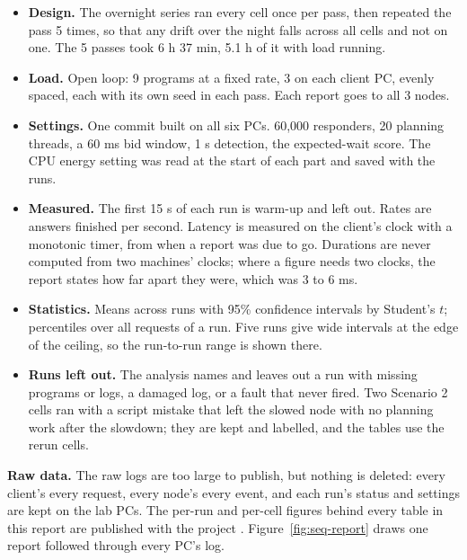 \begin{itemize}
  \item \textbf{Design.} The overnight series ran every cell once per pass, then repeated the pass 5 times, so that any drift over the night falls across all cells and not on one. The 5 passes took 6 h 37 min, 5.1 h of it with load running.
  \item \textbf{Load.} Open loop: 9 programs at a fixed rate, 3 on each client PC, evenly spaced, each with its own seed in each pass. Each report goes to all 3 nodes.
  \item \textbf{Settings.} One commit built on all six PCs. 60,000 responders, 20 planning threads, a 60 ms bid window, 1 s detection, the expected-wait score. The CPU energy setting was read at the start of each part and saved with the runs.
  \item \textbf{Measured.} The first 15 s of each run is warm-up and left out. Rates are answers finished per second. Latency is measured on the client's clock with a monotonic timer, from when a report was due to go. Durations are never computed from two machines' clocks; where a figure needs two clocks, the report states how far apart they were, which was 3 to 6 ms.
  \item \textbf{Statistics.} Means across runs with 95\% confidence intervals by Student's $t$; percentiles over all requests of a run. Five runs give wide intervals at the edge of the ceiling, so the run-to-run range is shown there.
  \item \textbf{Runs left out.} The analysis names and leaves out a run with missing programs or logs, a damaged log, or a fault that never fired. Two Scenario 2 cells ran with a script mistake that left the slowed node with no planning work after the slowdown; they are kept and labelled, and the tables use the rerun cells.
\end{itemize}

\textbf{Raw data.} The raw logs are too large to publish, but nothing is deleted: every client's every request, every node's every event, and each run's status and settings are kept on the lab PCs. The per-run and per-cell figures behind every table in this report are published with the project \cite{repo}. Figure~\ref{fig:seq-report} draws one report followed through every PC's log.
